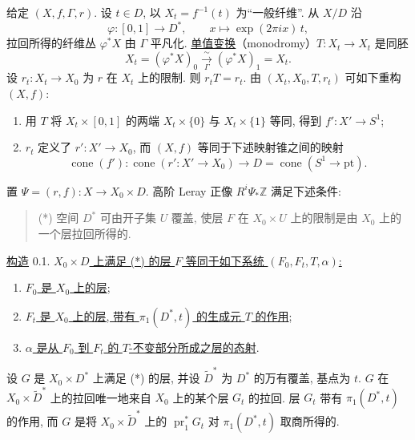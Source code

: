 给定 $(X,f,\Gamma,r)$. 设 $t\in D$, 以 $X_t=f^{-1}(t)$ 为“一般纤维”. 从 $X/D$ 沿
\begin{equation*}
\varphi:[0,1]\longrightarrow D^*,
\qquad x\longmapsto \exp(2\pi i x)\,t,
\end{equation*}
拉回所得的纤维丛 $\varphi^*X$ 由 $\Gamma$ 平凡化. \underline{单值变换}（monodromy）$T:X_t\longrightarrow X_t$ 是同胚
\begin{equation*}
X_t=(\varphi^*X)_0\xrightarrow[\Gamma]{\sim}
(\varphi^*X)_1=X_t.
\end{equation*}
设 $r_t:X_t\longrightarrow X_0$ 为 $r$ 在 $X_t$ 上的限制. 则 $r_tT=r_t$. 由 $(X_t,X_0,T,r_t)$ 可如下重构 $(X,f)$:
\begin{enumerate}[label=(\alph*),leftmargin=2.6em]
\item 用 $T$ 将 $X_t\times[0,1]$ 的两端 $X_t\times\{0\}$ 与 $X_t\times\{1\}$ 等同, 得到 $f':X'\longrightarrow S^1$;
\item $r_t$ 定义了 $r':X'\longrightarrow X_0$, 而 $(X,f)$ 等同于下述映射锥之间的映射
\begin{equation*}
\operatorname{cone}(f'):
\operatorname{cone}(r':X'\longrightarrow X_0)
\longrightarrow D=\operatorname{cone}(S^1\longrightarrow\mathrm{pt}).
\end{equation*}
\end{enumerate}


置 $\Psi=(r,f):X\longrightarrow X_0\times D$. 高阶 Leray 正像 $R^i\Psi_*\mathbb Z$ 满足下述条件:

\begin{quote}
(*) 空间 $D^*$ 可由开子集 $U$ 覆盖, 使层 $F$ 在 $X_0\times U$ 上的限制是由 $X_0$ 上的一个层拉回所得的.
\end{quote}

\underline{构造} 0.1. \underline{$X_0\times D$ 上满足 (*) 的层 $F$ 等同于如下系统 $(F_0,F_t,T,\alpha)$:}
\begin{enumerate}[label=\alph*),leftmargin=2.5em]
\item \underline{$F_0$ 是 $X_0$ 上的层};
\item \underline{$F_t$ 是 $X_0$ 上的层, 带有 $\pi_1(D^*,t)$ 的生成元 $T$ 的作用};
\item \underline{$\alpha$ 是从 $F_0$ 到 $F_t$ 的 $T$-不变部分所成之层的态射}.
\end{enumerate}

设 $G$ 是 $X_0\times D^*$ 上满足 (*) 的层, 并设 $\widetilde D^*$ 为 $D^*$ 的万有覆盖, 基点为 $t$. $G$ 在 $X_0\times\widetilde D^*$ 上的拉回唯一地来自 $X_0$ 上的某个层 $G_t$ 的拉回. 层 $G_t$ 带有 $\pi_1(D^*,t)$ 的作用, 而 $G$ 是将 $X_0\times\widetilde D^*$ 上的 $\operatorname{pr}_1^*G_t$ 对 $\pi_1(D^*,t)$ 取商所得的.

